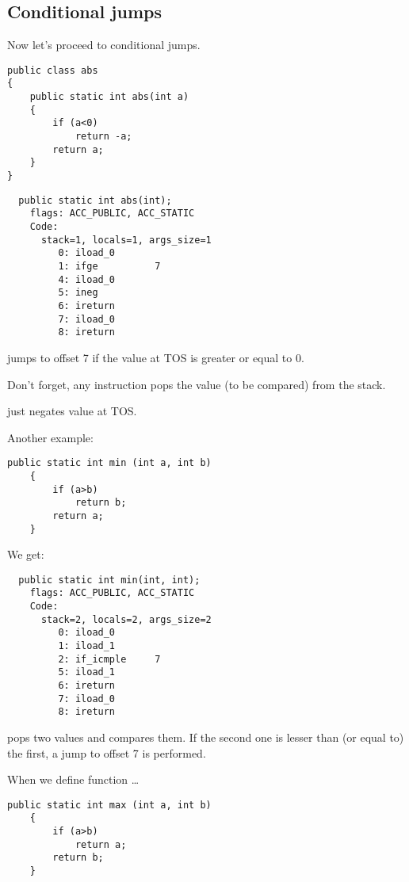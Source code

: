 \subsection{Conditional jumps}

Now let's proceed to conditional jumps.

\begin{lstlisting}[style=customjava]
public class abs
{
	public static int abs(int a)
	{
		if (a<0)
			return -a;
		return a;
	}
}
\end{lstlisting}

\begin{lstlisting}
  public static int abs(int);
    flags: ACC_PUBLIC, ACC_STATIC
    Code:
      stack=1, locals=1, args_size=1
         0: iload_0       
         1: ifge          7
         4: iload_0       
         5: ineg          
         6: ireturn       
         7: iload_0       
         8: ireturn       
\end{lstlisting}

 jumps to offset 7 if the value at \ac{TOS} is greater or equal to 0.

Don't forget, any  instruction pops the value (to be compared) from the stack.


 just negates value at \ac{TOS}.


Another example:

\begin{lstlisting}[style=customjava]
	public static int min (int a, int b)
	{
		if (a>b)
			return b;
		return a;
	}
\end{lstlisting}

We get:

\begin{lstlisting}
  public static int min(int, int);
    flags: ACC_PUBLIC, ACC_STATIC
    Code:
      stack=2, locals=2, args_size=2
         0: iload_0       
         1: iload_1       
         2: if_icmple     7
         5: iload_1       
         6: ireturn       
         7: iload_0       
         8: ireturn       
\end{lstlisting}

 pops two values and compares them.
If the second one is lesser than (or equal to) the first, a jump to offset 7 is performed.


When we define  function \dots


\begin{lstlisting}[style=customjava]
	public static int max (int a, int b)
	{
		if (a>b)
			return a;
		return b;
	}
\end{lstlisting}

